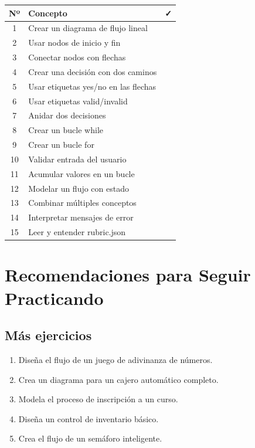 \documentclass[12pt]{article}
\begin{document}
\begin{center}
\begin{tabular}{|c|l|c|}
\hline
\textbf{Nº} & \textbf{Concepto} & \textbf{✓} \\
\hline
1 & Crear un diagrama de flujo lineal & \\
2 & Usar nodos de inicio y fin & \\
3 & Conectar nodos con flechas & \\
4 & Crear una decisión con dos caminos & \\
5 & Usar etiquetas yes/no en las flechas & \\
6 & Usar etiquetas valid/invalid & \\
7 & Anidar dos decisiones & \\
8 & Crear un bucle while & \\
9 & Crear un bucle for & \\
10 & Validar entrada del usuario & \\
11 & Acumular valores en un bucle & \\
12 & Modelar un flujo con estado & \\
13 & Combinar múltiples conceptos & \\
14 & Interpretar mensajes de error & \\
15 & Leer y entender rubric.json & \\
\hline
\end{tabular}
\end{center}

\newpage

\section{Recomendaciones para Seguir Practicando}

\subsection{Más ejercicios}

\begin{enumerate}
    \item Diseña el flujo de un juego de adivinanza de números.
    \item Crea un diagrama para un cajero automático completo.
    \item Modela el proceso de inscripción a un curso.
    \item Diseña un control de inventario básico.
    \item Crea el flujo de un semáforo inteligente.
\end{enumerate}
\end{document}
